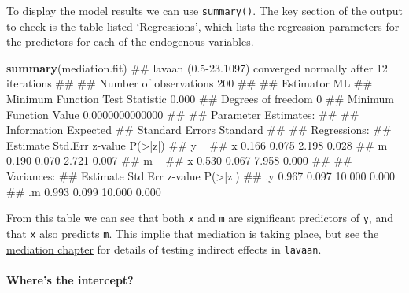 \documentclass[]{article}
\newenvironment{Shaded}{\begin{snugshade}}{\end{snugshade}}
\newcommand{\KeywordTok}[1]{\textcolor[rgb]{0.13,0.29,0.53}{\textbf{#1}}}
\newcommand{\NormalTok}[1]{#1}
\let\oldparagraph\paragraph
\renewcommand{\paragraph}[1]{\oldparagraph{#1}\mbox{}}
\theoremstyle{definition}
\theoremstyle{definition}
\theoremstyle{definition}
\theoremstyle{remark}
\begin{document}
To display the model results we can use \texttt{summary()}. The key
section of the output to check is the table listed `Regressions', which
lists the regression parameters for the predictors for each of the
endogenous variables.

\begin{Shaded}
\begin{Highlighting}[]
\KeywordTok{summary}\NormalTok{(mediation.fit)}
\NormalTok{## lavaan (0.5-23.1097) converged normally after  12 iterations}
\NormalTok{## }
\NormalTok{##   Number of observations                           200}
\NormalTok{## }
\NormalTok{##   Estimator                                         ML}
\NormalTok{##   Minimum Function Test Statistic                0.000}
\NormalTok{##   Degrees of freedom                                 0}
\NormalTok{##   Minimum Function Value               0.0000000000000}
\NormalTok{## }
\NormalTok{## Parameter Estimates:}
\NormalTok{## }
\NormalTok{##   Information                                 Expected}
\NormalTok{##   Standard Errors                             Standard}
\NormalTok{## }
\NormalTok{## Regressions:}
\NormalTok{##                    Estimate  Std.Err  z-value  P(>|z|)}
\NormalTok{##   y ~                                                 }
\NormalTok{##     x                 0.166    0.075    2.198    0.028}
\NormalTok{##     m                 0.190    0.070    2.721    0.007}
\NormalTok{##   m ~                                                 }
\NormalTok{##     x                 0.530    0.067    7.958    0.000}
\NormalTok{## }
\NormalTok{## Variances:}
\NormalTok{##                    Estimate  Std.Err  z-value  P(>|z|)}
\NormalTok{##    .y                 0.967    0.097   10.000    0.000}
\NormalTok{##    .m                 0.993    0.099   10.000    0.000}
\end{Highlighting}
\end{Shaded}

From this table we can see that both \texttt{x} and \texttt{m} are
significant predictors of \texttt{y}, and that \texttt{x} also predicts
\texttt{m}. This implie that mediation is taking place, but
\protect\hyperlink{mediation}{see the mediation chapter} for details of
testing indirect effects in \texttt{lavaan}.

\paragraph{Where's the intercept?}\label{wheres-the-intercept}
\end{document}
